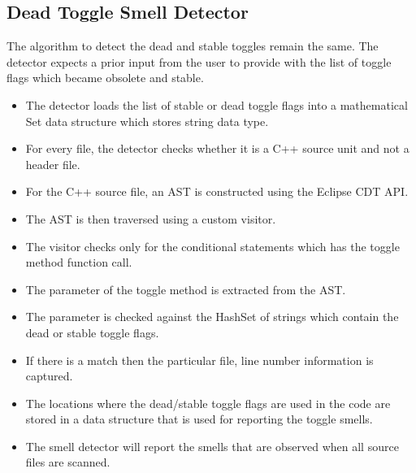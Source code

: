 \documentclass[conference]{IEEEtran}
\begin{document}
\subsection{Dead Toggle Smell Detector}
The algorithm to detect the dead and stable toggles remain the same. The detector expects a prior input from the user to provide with the list of toggle flags which became obsolete and stable. 
\begin{itemize}
  	\item The detector loads the list of stable or dead toggle flags into a mathematical Set data structure which stores string data type.
  	\item For every file, the detector checks whether it is a C++ source unit and not a header file.
  	\item For the C++ source file, an AST is constructed using the Eclipse CDT API.
	\item The AST is then traversed using a custom visitor.
	\item The visitor checks only for the conditional statements which has the toggle method function call.
	\item The parameter of the toggle method is extracted from the AST.
	\item The parameter is checked against the HashSet of strings which contain the dead or stable toggle flags.
	\item If there is a match then the particular file, line number information is captured.
	\item The locations where the dead/stable toggle flags are used in the code are stored in a data structure that is used for reporting the toggle smells.
	\item The smell detector will report the smells that are observed when all source files are scanned.
\end{itemize}
\end{document}
